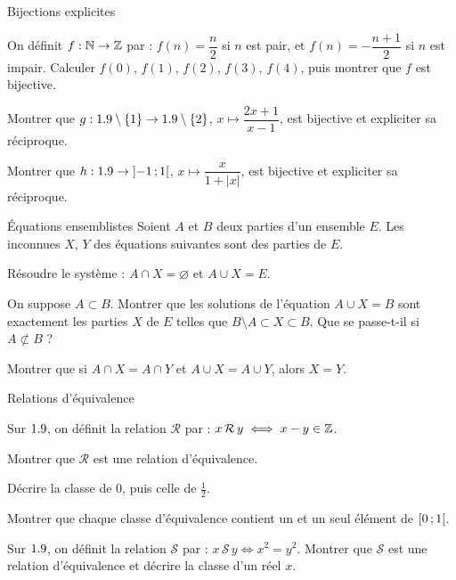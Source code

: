 \begin{exercice}[3]{Bijections explicites}
\begin{questions}
  \item On définit $f:\mathbb{N}\to\mathbb{Z}$ par : $f(n)=\dfrac{n}{2}$ si $n$ est pair, et
    $f(n)=-\dfrac{n+1}{2}$ si $n$ est impair. Calculer $f(0)$, $f(1)$,
    $f(2)$, $f(3)$, $f(4)$, puis montrer que $f$ est bijective.
  \item Montrer que $g:1.9\setminus\left\{1\right\}\to1.9\setminus\left\{2\right\}$,
    $x\mapsto\dfrac{2x+1}{x-1}$, est bijective et expliciter sa réciproque.
  \item Montrer que $h:1.9\to\mathopen{]}-1\,{;}\,1\mathclose{[}$,
    $x\mapsto\dfrac{x}{1+|x|}$, est bijective et expliciter sa réciproque.
\end{questions}
\end{exercice}

\begin{exercice}[3]{Équations ensemblistes}
Soient $A$ et $B$ deux parties d'un ensemble $E$. Les inconnues $X$, $Y$ des
équations suivantes sont des parties de $E$.
\begin{questions}
  \item Résoudre le système : $A\cap X=\varnothing$ et $A\cup X=E$.
  \item On suppose $A\subset B$. Montrer que les solutions de l'équation
    $A\cup X=B$ sont exactement les parties $X$ de $E$ telles que
    $B\setminus A\subset X\subset B$. Que se passe-t-il si
    $A\not\subset B$ ?
  \item Montrer que si $A\cap X=A\cap Y$ et $A\cup X=A\cup Y$, alors $X=Y$.
\end{questions}
\end{exercice}

\begin{exercice}[3]{Relations d'équivalence}
\begin{questions}
  \item Sur $1.9$, on définit la relation $\mathcal{R}$ par :
    $x\,\mathcal{R}\,y\iff x-y\in\mathbb{Z}$.
    \begin{questions}
      \item Montrer que $\mathcal{R}$ est une relation d'équivalence.
      \item Décrire la classe de $0$, puis celle de $\frac{1}{2}$.
      \item Montrer que chaque classe d'équivalence contient un et un seul
        élément de $\mathopen{[}0\,{;}\,1\mathclose{[}$.
    \end{questions}
  \item Sur $1.9$, on définit la relation $\mathcal{S}$ par :
    $x\,\mathcal{S}\,y\iff x^{2}=y^{2}$. Montrer que $\mathcal{S}$ est une
    relation d'équivalence et décrire la classe d'un réel $x$.
\end{questions}
\end{exercice}

